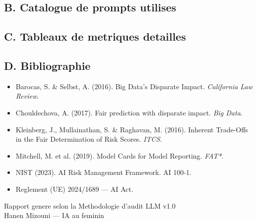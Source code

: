 \documentclass[a4paper,11pt]{article}
\begin{document}
\subsection{B. Catalogue de prompts utilises}

\subsection{C. Tableaux de metriques detailles}

\subsection{D. Bibliographie}
\begin{itemize}
    \item Barocas, S. \& Selbst, A. (2016). Big Data's Disparate Impact. \textit{California Law Review}.
    \item Chouldechova, A. (2017). Fair prediction with disparate impact. \textit{Big Data}.
    \item Kleinberg, J., Mullainathan, S. \& Raghavan, M. (2016). Inherent Trade-Offs in the Fair Determination of Risk Scores. \textit{ITCS}.
    \item Mitchell, M. et al. (2019). Model Cards for Model Reporting. \textit{FAT*}.
    \item NIST (2023). AI Risk Management Framework. AI 100-1.
    \item Reglement (UE) 2024/1689 --- AI Act.
\end{itemize}

\vfill

\begin{center}
\small\textcolor{grisfonce}{
Rapport genere selon la Methodologie d'audit LLM v1.0\\
Hanen Mizouni --- IA au feminin\\
}
\end{center}
\end{document}
